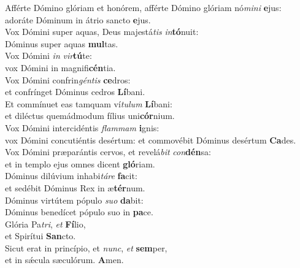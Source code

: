 \evenverse Afférte Dómino glóriam et honórem, afférte Dómino glóriam nó\textit{mi}\textit{ni} \textbf{e}jus:~\*\\
\evenverse adoráte Dóminum in átrio sancto \textbf{e}jus.\\
\oddverse Vox Dómini super aquas, Deus majestá\textit{tis} \textit{in}\textbf{tó}nuit:~\*\\
\oddverse Dóminus super aquas \textbf{mul}tas.\\
\evenverse Vox Dómini \textit{in} \textit{vir}\textbf{tú}te:~\*\\
\evenverse vox Dómini in magnifi\textbf{cén}tia.\\
\oddverse Vox Dómini confrin\textit{gén}\textit{tis} \textbf{ce}dros:~\*\\
\oddverse et confrínget Dóminus cedros \textbf{Lí}bani.\\
\evenverse Et commínuet eas tamquam ví\textit{tu}\textit{lum} \textbf{Lí}bani:~\*\\
\evenverse et diléctus quemádmodum fílius uni\textbf{cór}nium.\\
\oddverse Vox Dómini intercidéntis \textit{flam}\textit{mam} \textbf{i}gnis:~\*\\
\oddverse vox Dómini concutiéntis desértum: et commovébit Dóminus desértum \textbf{Ca}des.\\
\evenverse Vox Dómini præparántis cervos, et revelá\textit{bit} \textit{con}\textbf{dén}sa:~\*\\
\evenverse et in templo ejus omnes dicent \textbf{gló}riam.\\
\oddverse Dóminus dilúvium inhabi\textit{tá}\textit{re} \textbf{fa}cit:~\*\\
\oddverse et sedébit Dóminus Rex in æ\textbf{tér}num.\\
\evenverse Dóminus virtútem pópulo \textit{su}\textit{o} \textbf{da}bit:~\*\\
\evenverse Dóminus benedícet pópulo suo in \textbf{pa}ce.\\
\oddverse Glória Pa\textit{tri}, \textit{et} \textbf{Fí}lio,~\*\\
\oddverse et Spirítui \textbf{San}cto.\\
\evenverse Sicut erat in princípio, et \textit{nunc}, \textit{et} \textbf{sem}per,~\*\\
\evenverse et in sǽcula sæculórum. \textbf{A}men.\\
